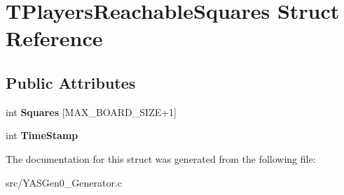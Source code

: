 \hypertarget{struct_t_players_reachable_squares}{}\section{T\+Players\+Reachable\+Squares Struct Reference}
\label{struct_t_players_reachable_squares}
\subsection*{Public Attributes}
\begin{DoxyCompactItemize}
\item 
\mbox{\label{struct_t_players_reachable_squares_ace9e7b5952c2f449dda0eed97d9a1117}} 
int {\bfseries Squares} \mbox{[}M\+A\+X\+\_\+\+B\+O\+A\+R\+D\+\_\+\+S\+I\+ZE+1\mbox{]}
\item 
\mbox{\label{struct_t_players_reachable_squares_ad8b3d2f53f1b7d5e02c9e8f4c86ba24e}} 
int {\bfseries Time\+Stamp}
\end{DoxyCompactItemize}


The documentation for this struct was generated from the following file\+:\begin{DoxyCompactItemize}
\item 
src/Y\+A\+S\+Gen0\+\_\+\+Generator.\+c\end{DoxyCompactItemize}
